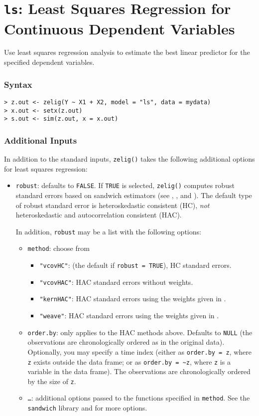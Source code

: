 \section{{\tt ls}: Least Squares Regression for Continuous
Dependent Variables}
\label{ls}

Use least squares regression analysis to estimate the best linear
predictor for the specified dependent variables.

\subsubsection{Syntax}

\begin{verbatim}
> z.out <- zelig(Y ~ X1 + X2, model = "ls", data = mydata)
> x.out <- setx(z.out)
> s.out <- sim(z.out, x = x.out)
\end{verbatim}

\subsubsection{Additional Inputs}  

In addition to the standard inputs, {\tt zelig()} takes the following
additional options for least squares regression:  
\begin{itemize}
\item {\tt robust}: defaults to {\tt FALSE}.  If {\tt TRUE} is
selected, {\tt zelig()} computes robust standard errors based on
sandwich estimators (see \cite{Zeileis04}, \cite{Huber81}, and
\cite{White80}).  The default type of robust standard error is
heteroskedastic consistent (HC), \emph{not} heteroskedastic and
autocorrelation consistent (HAC).  

In addition, {\tt robust} may be a list with the following options:  
\begin{itemize}
\item {\tt method}:  choose from 
\begin{itemize}
\item {\tt "vcovHC"}: (the default if {\tt robust = TRUE}), HC standard errors.
\item {\tt "vcovHAC"}: HAC standard errors without weights.  
\item {\tt "kernHAC"}: HAC standard errors using the weights given in
\cite{Andrews91}.   
\item {\tt "weave"}: HAC standard errors using the weights given in
\cite{LumHea99}.
\end{itemize} 
\item {\tt order.by}: only applies to the HAC methods above.  Defaults to
{\tt NULL} (the observations are chronologically ordered as in the
original data).  Optionally, you may specify a time index (either as
{\tt order.by = z}, where {\tt z} exists outside the data frame; or
as {\tt order.by = \~{}z}, where {\tt z} is a variable in the data
frame).  The observations are chronologically ordered by the size of
{\tt z}.
\item {\tt \dots}:  additional options passed to the functions
specified in {\tt method}.  See the {\tt sandwich} library and
\cite{Zeileis04} for more options.   
\end{itemize}
\end{itemize}

